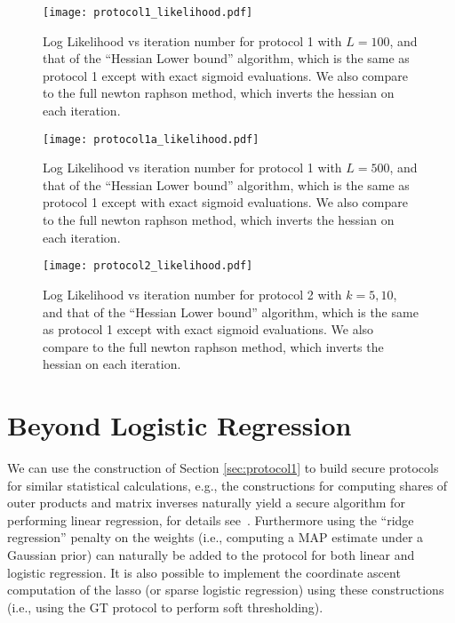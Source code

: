 \documentclass[11pt]{article}
\begin{document}
\begin{figure}[h]
  \centering
      \texttt{[image: protocol1\_likelihood.pdf]}
  \caption{Log Likelihood vs iteration number for protocol 1 with $L=100$, and that of the ``Hessian Lower bound'' algorithm, which is the same as protocol 1 except with exact sigmoid evaluations.  We also compare to the full newton raphson method, which inverts the hessian on each iteration.}
\label{fig_like1}
\end{figure}


\begin{figure}[h]
  \centering
      \texttt{[image: protocol1a\_likelihood.pdf]}
  \caption{Log Likelihood vs iteration number for protocol 1 with $L=500$, and that of the ``Hessian Lower bound'' algorithm, which is the same as protocol 1 except with exact sigmoid evaluations.  We also compare to the full newton raphson method, which inverts the hessian on each iteration.}
\label{fig_like1a}
\end{figure}


\begin{figure}[h]
  \centering
      \texttt{[image: protocol2\_likelihood.pdf]}
  \caption{Log Likelihood vs iteration number for protocol 2 with $k=5,10$, and that of the ``Hessian Lower bound'' algorithm, which is the same as protocol 1 except with exact sigmoid evaluations.  We also compare to the full newton raphson method, which inverts the hessian on each iteration.}
\label{fig_like2}
\end{figure}


\section{Beyond Logistic Regression}\label{sec:extension}

We can use the construction of Section \ref{sec:protocol1} to build secure protocols for similar statistical calculations, e.g.,  the constructions for computing shares of outer products and matrix inverses naturally yield a secure algorithm for performing linear regression, for details see~\cite{fhn:10}.  Furthermore using the ``ridge regression'' penalty on the weights (i.e., computing a MAP estimate under a Gaussian prior) can naturally be added to the protocol for both linear and logistic regression.  It is also possible to implement the coordinate ascent computation of the lasso (or sparse logistic regression) using these constructions (i.e., using the GT protocol to perform soft thresholding).
\end{document}
